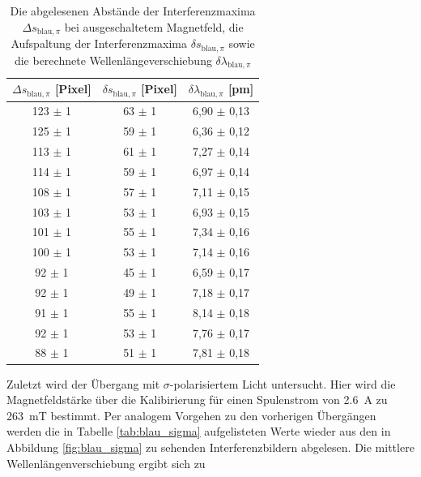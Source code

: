               \begin{table}[h]
                \centering
                \caption{Die abgelesenen Abstände der Interferenzmaxima $\Delta s_{\text{blau}, \pi}$ bei ausgeschaltetem Magnetfeld, die Aufspaltung der Interferenzmaxima $\delta s_{\text{blau}, \pi}$ sowie die berechnete Wellenlängeverschiebung $\delta \lambda_{\text{blau}, \pi}$}
                \label{tab:blau_pi}
              
                \begin{tabular}{c c c}
                  \toprule
                  {$\Delta s_{\text{blau}, \pi}$ [Pixel]} & {$\delta s_{\text{blau}, \pi}$ [Pixel]} & {$\delta \lambda_{\text{blau}, \pi}$ [\si{\pico\metre}]} \\ 
                  \midrule
                   123 $\pm$ 1  &   63 $\pm$ 1   &   6,90 $\pm$ 0,13   \\
                   125 $\pm$ 1  &   59 $\pm$ 1   &   6,36 $\pm$ 0,12   \\
                   113 $\pm$ 1  &   61 $\pm$ 1   &   7,27 $\pm$ 0,14   \\
                   114 $\pm$ 1  &   59 $\pm$ 1   &   6,97 $\pm$ 0,14   \\
                   108 $\pm$ 1  &   57 $\pm$ 1   &   7,11 $\pm$ 0,15   \\
                   103 $\pm$ 1  &   53 $\pm$ 1   &   6,93 $\pm$ 0,15   \\
                   101 $\pm$ 1  &   55 $\pm$ 1   &   7,34 $\pm$ 0,16   \\
                   100 $\pm$ 1  &   53 $\pm$ 1   &   7,14 $\pm$ 0,16   \\
                   92  $\pm$ 1  &   45 $\pm$ 1   &   6,59 $\pm$ 0,17   \\
                   92  $\pm$ 1  &   49 $\pm$ 1   &   7,18 $\pm$ 0,17   \\
                   91  $\pm$ 1  &   55 $\pm$ 1   &   8,14 $\pm$ 0,18   \\
                   92  $\pm$ 1  &   53 $\pm$ 1   &   7,76 $\pm$ 0,17   \\
                   88  $\pm$ 1  &   51 $\pm$ 1   &   7,81 $\pm$ 0,18   \\

                  \bottomrule
                \end{tabular}
              \end{table}
              \FloatBarrier


              Zuletzt wird der Übergang mit $\sigma$-polarisiertem Licht untersucht. Hier wird die Magnetfeldstärke über die Kalibirierung für einen Spulenstrom von \SI{2.6}{\ampere} 
              zu \SI{263}{\milli\tesla} bestimmt. Per analogem Vorgehen zu den vorherigen Übergängen werden die in Tabelle \ref{tab:blau_sigma} aufgelisteten Werte wieder aus
              den in Abbildung \ref{fig:blau_sigma} zu sehenden Interferenzbildern abgelesen. Die mittlere Wellenlängenverschiebung ergibt sich zu

